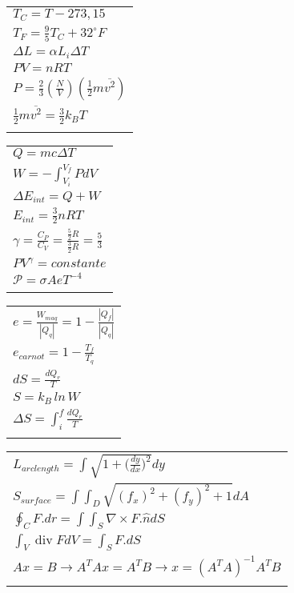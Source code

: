 \documentclass[a4paper]{article}
\DeclareMathOperator{\Div}{div}
\begin{document}
\begin{tabular}{|l|}
\hline
$ T_C = T - 273,15 $\\
$ T_F = \frac{9}{5}T_C + 32^{\circ} F $\\
$ \Delta L = \alpha L_i \Delta T $\\
$ PV = nRT $\\
$ P = \frac{2}{3}(\frac{N}{V})(\frac{1}{2}m\overline{v^2}) $ \\
$ \frac{1}{2}m\overline{v^2} = \frac{3}{2}k_BT $\\
\\
\hline
\end{tabular}
\begin{tabular}{|l|}
\hline
$ Q = mc \Delta T $\\
$ W = - \int_{V_i}^{V_f} P dV $\\
$ \Delta E_{int} = Q + W $\\
$ E_{int} = \frac{3}{2}nRT $\\
$ \gamma = \frac{C_P}{C_V} = \frac{\frac{5}{2}R}{\frac{3}{2}R} = \frac{5}{3} $\\
$ PV^\gamma = constante $\\
$ \mathscr{P} = \sigma A e T^{-4} $ \\

\\
\hline
\end{tabular}
\begin{tabular}{|l|}
\hline
$ e = \frac{W_{maq}}{|Q_q|} = 1 - \frac{|Q_f|}{|Q_q|} $\\
$ e_{carnot} = 1 - \frac{T_f}{T_q} $\\
$ dS = \frac{dQ_r}{T} $\\
$ S = k_B \, ln \, W $\\
$ \Delta S = \int_i^f \frac{dQ_r}{T} $\\
\\
\hline
\end{tabular}
\begin{tabular}{|l|}
\hline
$ L_{arc length} = \int \sqrt{1 + \Big(\frac{dy}{dx}\Big)^2} dy $\\
$ S_{surface} = \int \int_D \sqrt{(f_x)^2 + (f_y)^2 + 1} dA $\\
$ \oint_C F.dr = \int \int_S \nabla \times F.\hat{n}dS $\\
$ \int_V \Div F dV = \int_S F.dS $ \\
$ Ax = B \to A^TAx = A^TB \to x = (A^TA)^{-1} A^TB$\\
\\
\hline
\end{tabular}
\end{document}
